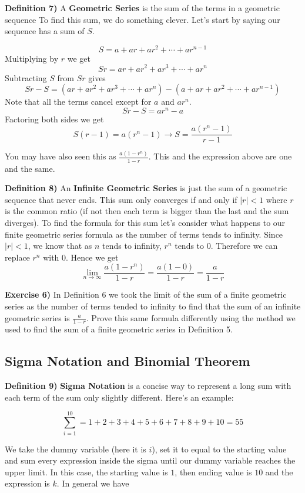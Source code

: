 \documentclass[a4paper]{article}
\begin{document}
\textbf{Definition 7)} A \textbf{Geometric Series} is the sum of the terms in a geometric sequence
To find this sum, we do something clever. Let's start by saying our sequence has a sum of $S$.

$$S=a+ar+ar^2+\cdots+ar^{n-1}$$
Multiplying by $r$ we get
$$Sr=ar+ar^2+ar^3+\cdots+ar^{n}$$
Subtracting $S$ from $Sr$ gives
$$Sr-S=(ar+ar^2+ar^3+\cdots+ar^{n})-(a+ar+ar^2+\cdots+ar^{n-1})$$
Note that all the terms cancel except for $a$ and $ar^{n}$.
$$Sr-S=ar^{n}-a$$
Factoring both sides we get
$$S(r-1)=a(r^n-1) \longrightarrow \boxed{S=\frac{a(r^n-1)}{r-1}}$$

You may have also seen this as $\frac{a(1-r^n)}{1-r}$. This and the expression above are one and the same.

\textbf{Definition 8)} An \textbf{Infinite Geometric Series} is just the sum of a geometric sequence that never ends. This sum only converges 
if and only if $|r|<1$ where $r$ is  the common ratio (if not then each term is bigger than the last and the sum diverges). To find the formula for this 
sum let's consider what happens to our finite geometric series formula as the number of terms tends to infinity. Since $|r|<1$, we know that as
$n$ tends to infinity, $r^n$ tends to $0$. Therefore we can replace $r^n$ with $0$. Hence we get
$$\lim_{n \rightarrow \infty}{\frac{a(1-r^n)}{1-r}} = \frac{a(1-0)}{1-r}=\boxed{\frac{a}{1-r}}$$

\textbf{Exercise 6)} In Definition 6 we took the limit of the sum of a finite geometric series as the number of terms tended to 
infinity to find that the sum of an infinite geometric series is $\frac{a}{1-r}$. Prove this same formula differently using the method we used 
to find the sum of a finite geometric series in Definition 5.
\subsection{Sigma Notation and Binomial Theorem}

\textbf{Definition 9)} \textbf{Sigma Notation} is a concise way to represent a long sum with each term of the sum only slightly different. Here's an example:

$$\sum_{i=1}^{10}=1+2+3+4+5+6+7+8+9+10=55$$

We take the dummy variable (here it is $i$), set it to equal to the starting value and sum every expression inside the sigma until our dummy variable reaches the upper limit. In this case, the starting value is $1$, then ending value is $10$ and the expression is $k$. In general we have
\end{document}
